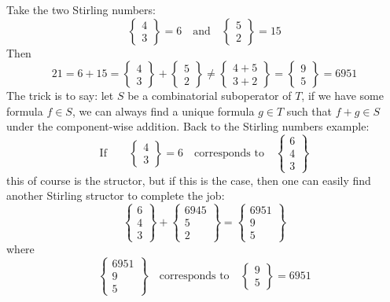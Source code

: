 \documentclass[twoside]{article}
\begin{document}
Take the two Stirling numbers:
$$ \left\{ \!\!\!\begin{array}{c} 4 \\ 3 \end{array}\!\!\!\right\}=6\quad\mbox{and}\quad
   \left\{ \!\!\!\begin{array}{c} 5 \\ 2 \end{array}\!\!\!\right\}=15 $$
Then
$$ 21=6+15=\left\{ \!\!\!\begin{array}{c} 4 \\ 3 \end{array}\!\!\!\right\}+
   \left\{ \!\!\!\begin{array}{c} 5 \\ 2 \end{array}\!\!\!\right\}\neq
   \left\{ \!\!\!\begin{array}{c} 4+5 \\ 3+2 \end{array}\!\!\!\right\}=
   \left\{ \!\!\!\begin{array}{c} 9 \\ 5 \end{array}\!\!\!\right\}=6951 $$
The trick is to say: let $ S $ be a combinatorial suboperator of $ T $, if we have some formula $ f\in S $, we can
always find a unique formula $ g\in T $ such that $ f+g\in S $ under the component-wise addition.  Back to the
Stirling numbers example:
$$ \mbox{If}\qquad\left\{ \!\!\!\begin{array}{c} 4 \\ 3 \end{array}\!\!\!\right\}=6\quad\mbox{corresponds to}\quad
\left\{\!\!\!
\begin{array}{c}
6\\ 4\\ 3
\end{array}\!\!\!\right\} $$
this of course is the structor, but if this is the case, then one can easily find another Stirling structor to complete
the job:
$$ \left\{\!\!\!\begin{array}{c} 6\\ 4\\ 3 \end{array}\!\!\!\right\}+
   \left\{\!\!\!\begin{array}{c} 6945\\ 5\\ 2 \end{array}\!\!\!\right\}=
   \left\{\!\!\!\begin{array}{c} 6951\\ 9\\ 5 \end{array}\!\!\!\right\} $$
where
$$ \left\{\!\!\!
\begin{array}{c}
6951\\ 9\\ 5
\end{array}\!\!\!\right\}\quad\mbox{corresponds to}\quad
\left\{ \!\!\!\begin{array}{c} 9 \\ 5 \end{array}\!\!\!\right\}=6951 $$
\end{document}
